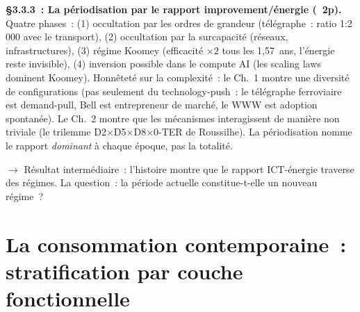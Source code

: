 {\textbf{\S3.3.3~: La périodisation par le rapport improvement/énergie (~2p).}
Quatre phases~: (1) occultation par les ordres de grandeur (télégraphe~: ratio 1:2\,000 avec le transport), (2) occultation par la surcapacité (réseaux, infrastructures), (3) régime Koomey (efficacité $\times 2$ tous les 1,57~ans, l'énergie reste invisible), (4) inversion possible dans le compute AI (les scaling laws dominent Koomey). Honnêteté sur la complexité~: le Ch.~1 montre une diversité de configurations (pas seulement du technology-push~: le télégraphe ferroviaire est demand-pull, Bell est entrepreneur de marché, le WWW est adoption spontanée). Le Ch.~2 montre que les mécanismes interagissent de manière non triviale (le trilemme D2$\times$D5$\times$D8$\times$0-TER de Roussilhe). La périodisation nomme le rapport \emph{dominant} à chaque époque, pas la totalité.

$\to$ Résultat intermédiaire~: l'histoire montre que le rapport ICT-énergie traverse des régimes. La question~: la période actuelle constitue-t-elle un nouveau régime~?}


\clearpage
\section{La consommation contemporaine~: stratification par couche fonctionnelle}\label{sec:stratification}

